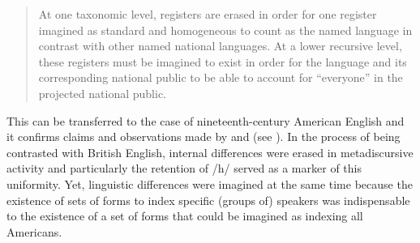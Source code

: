 \begin{quote}
At one taxonomic level, registers are erased in order for one register imagined as standard and homogeneous to count as the named language in contrast with other named national languages. At a lower recursive level, these registers must be imagined to exist in order for the language and its corresponding national public to be able to account for “everyone” in the projected national public. \citep[71]{Frekko2009}
\end{quote}


This can be transferred to the case of nineteenth-century American English and it confirms claims and observations made by \citet{Cooley1992} and \citet{Minnick2010} (see ). In the process of being contrasted with British English, internal differences were erased in metadiscursive activity and particularly the retention of /h/ served as a marker of this uniformity. Yet, linguistic differences were imagined at the same time because the existence of sets of forms to index specific (groups of) speakers was indispensable to the existence of a set of forms that could be imagined as indexing all Americans.


